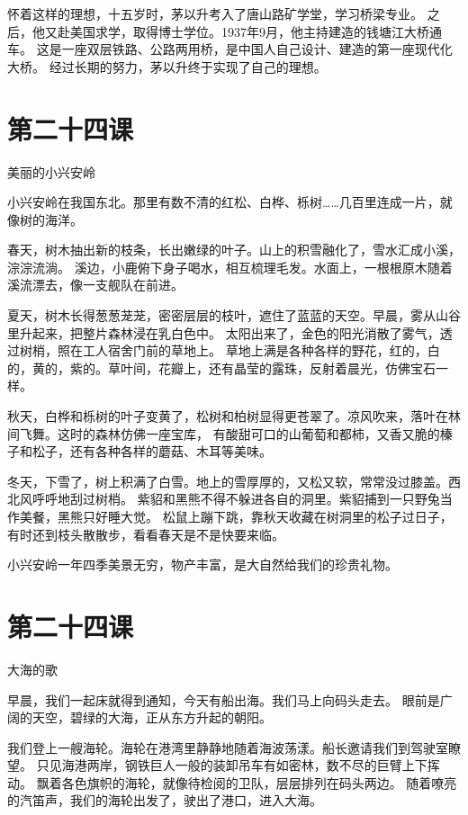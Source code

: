 \documentclass[12pt,UTF8]{ctexbook}
\begin{document}
怀着这样的理想，十五岁时，茅以升考入了唐山路矿学堂，学习桥梁专业。
之后，他又赴美国求学，取得博士学位。1937年9月，他主持建造的钱塘江大桥通车。
这是一座双层铁路、公路两用桥，是中国人自己设计、建造的第一座现代化大桥。
经过长期的努力，茅以升终于实现了自己的理想。

\section{第二十四课}

美丽的小兴安岭

小兴安岭在我国东北。那里有数不清的红松、白桦、栎树……几百里连成一片，就像树的海洋。

春天，树木抽出新的枝条，长出嫩绿的叶子。山上的积雪融化了，雪水汇成小溪，淙淙流淌。
溪边，小鹿俯下身子喝水，相互梳理毛发。水面上，一根根原木随着溪流漂去，像一支舰队在前进。

夏天，树木长得葱葱茏茏，密密层层的枝叶，遮住了蓝蓝的天空。早晨，雾从山谷里升起来，把整片森林浸在乳白色中。
太阳出来了，金色的阳光消散了雾气，透过树梢，照在工人宿舍门前的草地上。
草地上满是各种各样的野花，红的，白的，黄的，紫的。草叶间，花瓣上，还有晶莹的露珠，反射着晨光，仿佛宝石一样。

秋天，白桦和栎树的叶子变黄了，松树和柏树显得更苍翠了。凉风吹来，落叶在林间飞舞。这时的森林仿佛一座宝库，
有酸甜可口的山葡萄和都柿，又香又脆的榛子和松子，还有各种各样的蘑菇、木耳等美味。

冬天，下雪了，树上积满了白雪。地上的雪厚厚的，又松又软，常常没过膝盖。西北风呼呼地刮过树梢。
紫貂和黑熊不得不躲进各自的洞里。紫貂捕到一只野兔当作美餐，黑熊只好睡大觉。
松鼠上蹦下跳，靠秋天收藏在树洞里的松子过日子，有时还到枝头散散步，看看春天是不是快要来临。

小兴安岭一年四季美景无穷，物产丰富，是大自然给我们的珍贵礼物。

\section{第二十四课}

大海的歌

早晨，我们一起床就得到通知，今天有船出海。我们马上向码头走去。
眼前是广阔的天空，碧绿的大海，正从东方升起的朝阳。

我们登上一艘海轮。海轮在港湾里静静地随着海波荡漾。船长邀请我们到驾驶室瞭望。
只见海港两岸，钢铁巨人一般的装卸吊车有如密林，数不尽的巨臂上下挥动。
飘着各色旗帜的海轮，就像待检阅的卫队，层层排列在码头两边。
随着嘹亮的汽笛声，我们的海轮出发了，驶出了港口，进入大海。
\end{document}
